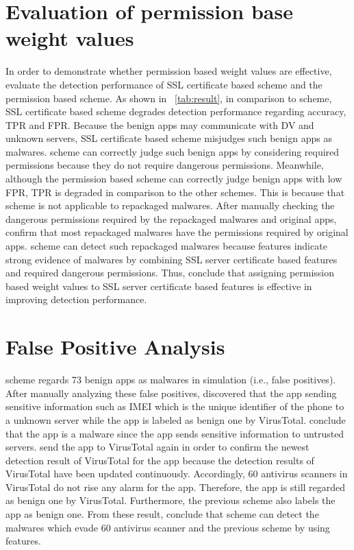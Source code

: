 \section{Evaluation of permission base weight values} 
In order to demonstrate whether permission based weight values are effective, \we evaluate the detection performance of SSL certificate based scheme and the permission based scheme.
As shown in \tablename~\ref{tab:result}, in comparison to \our scheme, SSL certificate based scheme degrades detection performance regarding accuracy, TPR and FPR.
Because the benign apps may communicate with DV and unknown servers, SSL certificate based scheme misjudges such benign apps as malwares.
\Our scheme can correctly judge such benign apps by considering required permissions because they do not require dangerous permissions.
Meanwhile, although the permission based scheme can correctly judge benign apps with low FPR, TPR is degraded in comparison to the other schemes.
This is because that scheme is not applicable to repackaged malwares.
After manually checking the dangerous permissions required by the repackaged malwares and original apps, \we confirm that most repackaged malwares have the permissions required by original apps.
\Our scheme can detect such repackaged malwares because \our features indicate strong evidence of malwares by combining SSL server certificate based features and required dangerous permissions.
Thus, \we conclude that assigning permission based weight values to SSL server certificate based features is effective in improving detection performance.  
\afterpage{\clearpage}
\newpage

\section{False Positive Analysis}
\Our scheme regards 73 benign apps as malwares in \our simulation (i.e., false positives).
After manually analyzing these false positives, \we discovered that the app sending sensitive information such as IMEI which is the unique identifier of the phone to a unknown server while the app is labeled as benign one by VirusTotal.
\we conclude that the app is a malware since the app sends sensitive information to untrusted servers. 
\We send the app to VirusTotal again in order to confirm the newest detection result of VirusTotal for the app because the detection results of VirusTotal have been updated continuously.
Accordingly, 60 antivirus scanners in VirusTotal do not rise any alarm for the app.
Therefore, the app is still regarded as benign one by VirusTotal.
Furthermore, the previous scheme also labels the app as benign one.
From these result, \we conclude that \our scheme can detect the malwares which evade 60 antivirus scanner and the previous scheme by using \our features.  

